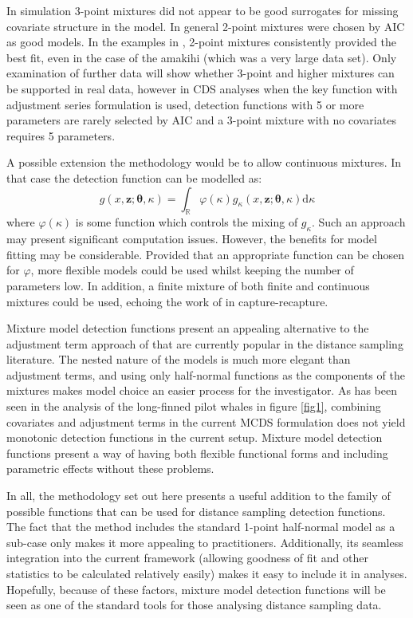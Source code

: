 In simulation 3-point mixtures did not appear to be good surrogates for missing covariate structure in the model. In general 2-point mixtures were chosen by AIC as good models. In the examples in , 2-point mixtures consistently provided the best fit, even in the case of the amakihi (which was a very large data set). Only examination of further data will show whether 3-point and higher mixtures can be supported in real data, however in CDS analyses when the key function with adjustment series formulation is used, detection functions with 5 or more parameters are rarely selected by AIC and a 3-point mixture with no covariates requires 5 parameters.

A possible extension the methodology would be to allow continuous mixtures. In that case the detection function can be modelled as:
\begin{equation*}
g(x,\mathbf{z}; \bm{\theta}, \kappa) = \int_\mathbb{R} \varphi(\kappa) g_\kappa(x,\mathbf{z}; \bm{\theta}, \kappa) \text{d}\kappa
\end{equation*}
where $\varphi(\kappa)$ is some function which controls the mixing of $g_\kappa$. Such an approach may present significant computation issues. However, the benefits for model fitting may be considerable. Provided that an appropriate function can be chosen for $\varphi$, more flexible models could be used whilst keeping the number of parameters low. In addition, a finite mixture of both finite and continuous mixtures could be used, echoing the work of  in capture-recapture.

Mixture model detection functions present an appealing alternative to the adjustment term approach of  that are currently popular in the distance sampling literature. The nested nature of the models is much more elegant than adjustment terms, and using only half-normal functions as the components of the mixtures makes model choice an easier process for the investigator. As has been seen in the analysis of the long-finned pilot whales in figure \ref{fig1}, combining covariates and adjustment terms in the current MCDS formulation does not yield monotonic detection functions in the current setup. Mixture model detection functions present a way of having both flexible functional forms and including parametric effects without these problems.

In all, the methodology set out here presents a useful addition to the family of possible functions that can be used for distance sampling detection functions. The fact that the method includes the standard 1-point half-normal model as a sub-case only makes it more appealing to practitioners. Additionally, its seamless integration into the current framework (allowing goodness of fit and other statistics to be calculated relatively easily) makes it easy to include it in analyses. Hopefully, because of these factors, mixture model detection functions will be seen as one of the standard tools for those analysing distance sampling data.

